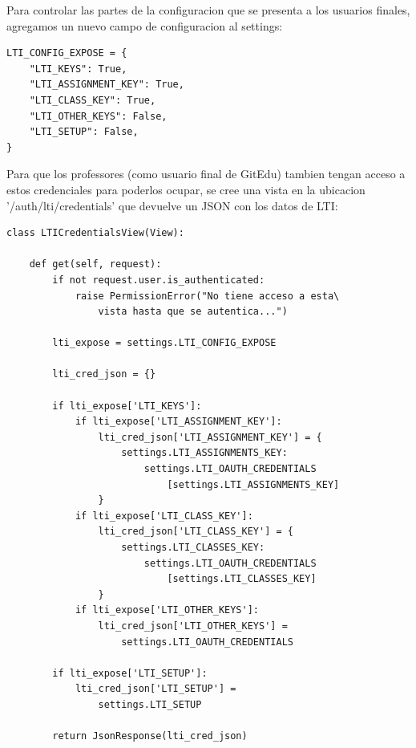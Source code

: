 Para controlar las partes de la configuracion que se presenta a los usuarios finales, agregamos un nuevo campo de configuracion al settings:
\lstset{language=Python}
\begin{lstlisting}
LTI_CONFIG_EXPOSE = {
    "LTI_KEYS": True,
    "LTI_ASSIGNMENT_KEY": True,
    "LTI_CLASS_KEY": True,
    "LTI_OTHER_KEYS": False,
    "LTI_SETUP": False,
}
\end{lstlisting}
\lstset{language=Bash}

Para que los professores (como usuario final de GitEdu) tambien tengan acceso a estos credenciales para poderlos ocupar, se cree una vista en la ubicacion '/auth/lti/credentials' que devuelve un JSON con los datos de LTI:
\lstset{language=Python}
\begin{lstlisting}
class LTICredentialsView(View):

    def get(self, request):
        if not request.user.is_authenticated:
            raise PermissionError("No tiene acceso a esta\
                vista hasta que se autentica...")

        lti_expose = settings.LTI_CONFIG_EXPOSE

        lti_cred_json = {}

        if lti_expose['LTI_KEYS']:
            if lti_expose['LTI_ASSIGNMENT_KEY']:
                lti_cred_json['LTI_ASSIGNMENT_KEY'] = {
                    settings.LTI_ASSIGNMENTS_KEY: 
                        settings.LTI_OAUTH_CREDENTIALS
                            [settings.LTI_ASSIGNMENTS_KEY]
                }
            if lti_expose['LTI_CLASS_KEY']:
                lti_cred_json['LTI_CLASS_KEY'] = {
                    settings.LTI_CLASSES_KEY:
                        settings.LTI_OAUTH_CREDENTIALS
                            [settings.LTI_CLASSES_KEY]
                }
            if lti_expose['LTI_OTHER_KEYS']:
                lti_cred_json['LTI_OTHER_KEYS'] =
                    settings.LTI_OAUTH_CREDENTIALS

        if lti_expose['LTI_SETUP']:
            lti_cred_json['LTI_SETUP'] =
                settings.LTI_SETUP

        return JsonResponse(lti_cred_json)
\end{lstlisting}
\lstset{language=Bash}

